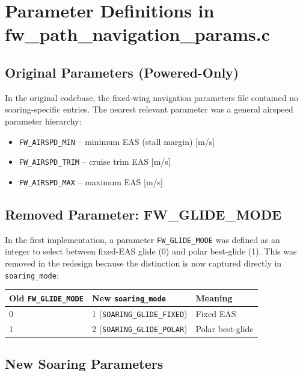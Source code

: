 \documentclass[12pt,a4paper]{article}
\begin{document}
\section{Parameter Definitions in fw\_path\_navigation\_params.c}

\subsection{Original Parameters (Powered-Only)}

In the original codebase, the fixed-wing navigation parameters file
contained no soaring-specific entries. The nearest relevant parameter was
a general airspeed parameter hierarchy:

\begin{itemize}
  \item \texttt{FW\_AIRSPD\_MIN} -- minimum EAS (stall margin) [m/s]
  \item \texttt{FW\_AIRSPD\_TRIM} -- cruise trim EAS [m/s]
  \item \texttt{FW\_AIRSPD\_MAX} -- maximum EAS [m/s]
\end{itemize}

\subsection{Removed Parameter: FW\_GLIDE\_MODE}

In the first implementation, a parameter \texttt{FW\_GLIDE\_MODE} was
defined as an integer to select between fixed-EAS glide (0) and polar
best-glide (1). This was removed in the redesign because the distinction
is now captured directly in \texttt{soaring\_mode}:

\begin{center}
\begin{tabular}{lll}
\toprule
Old \texttt{FW\_GLIDE\_MODE} & New \texttt{soaring\_mode} & Meaning \\
\midrule
0 & 1 (\texttt{SOARING\_GLIDE\_FIXED}) & Fixed EAS \\
1 & 2 (\texttt{SOARING\_GLIDE\_POLAR}) & Polar best-glide \\
\bottomrule
\end{tabular}
\end{center}

\subsection{New Soaring Parameters}
\end{document}
